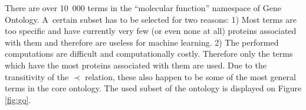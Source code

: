 \documentclass[11pt,twoside,a4paper]{book}
\begin{document}
There are over 10~000 terms in the ``molecular function'' namespace of Gene Ontology.
A~certain subset has to be selected for two reasons:
1) Most terms are too specific and have currently very few (or even none at all) proteins associated with them
and therefore are useless for machine learning.
2) The performed computations are difficult and computationally costly.
Therefore only the terms which have the most proteins associated with them are used.
Due to the transitivity of the $\prec$ relation,
these also happen to be some of the most general terms in the core ontology.
The used subset of the ontology is displayed on Figure \ref{fig:go}.
                                                                                                                                                                                                                                                                                                                                                                                                                                                                                                                                                                                                                                                                                                                                               
\end{document}
